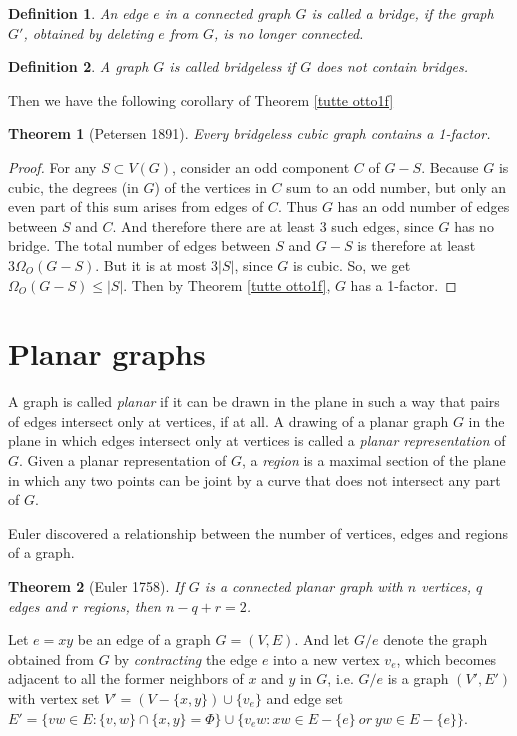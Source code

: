 \documentclass[12pt]{report}
\newtheorem{theorem}{Theorem}
\newtheorem{definition}{Definition}
\begin{document}
\begin{definition}
An edge $e$ in a connected graph $G$ is called a bridge, if the graph $G'$, obtained by deleting $e$ from $G$, is no longer connected.
\end{definition}
\begin{definition}\label{bilede}
A graph $G$ is called bridgeless if $G$ does not contain bridges.
\end{definition}
Then we have the following corollary of Theorem \ref{tutte otto1f}

\begin{theorem}[Petersen 1891]\label{petbrile1fa}
Every bridgeless cubic graph contains a 1-factor.
\end{theorem}
\begin{proof}
For any $S\subset V(G)$, consider an odd component $C$ of $G-S$. Because $G$ is cubic, the degrees (in $G$) of the vertices in $C$ sum to an odd number, but only an even part of this sum arises from edges of $C$. Thus $G$ has an odd number of edges between $S$ and $C$. And therefore there are at least 3 such edges, since $G$ has no bridge. The total number of edges between $S$ and $G-S$ is therefore at least $3\Omega_O(G-S)$. But it is at most $3|S|$, since $G$ is cubic. So, we get $\Omega_O(G-S)\le|S|$. Then by Theorem \ref{tutte otto1f}, $G$ has a 1-factor.
\end{proof}


\section{Planar graphs}\label{secnoplg}
A graph is called {\em planar} if it can be drawn in the plane in such a way that pairs of edges intersect only at vertices, if at all. A drawing of a planar graph $G$ in the plane in which edges intersect only at vertices is called a {\em planar representation} of $G$.
Given a planar representation of $G$, a {\em region} is a maximal section of the plane in which any two points can be joint by a curve that does not intersect any part of $G$.

Euler discovered a relationship between the number of vertices, edges and regions of a graph.
\begin{theorem}[Euler 1758]
If  $G$ is a connected planar graph with $n$ vertices, $q$ edges and $r$ regions, then $n-q+r=2$.
\end{theorem}

Let $e=xy$ be an edge of a graph $G=(V,E)$. And let $G/e$ denote the graph obtained from $G$ by {\em contracting} the edge $e$ into a new vertex $v_e$, which becomes adjacent to all the former neighbors of $x$ and $y$ in $G$, i.e. $G/e$ is a graph $(V',E')$ with vertex set $V'=(V-\{x,y\})\cup\{v_e\}$ and edge set $E'=\{vw\in E:\{v,w\}\cap\{x,y\}=\Phi\}\cup\{v_ew:xw\in E-\{e\}~or~yw\in E-\{e\}\}$.
\end{document}

